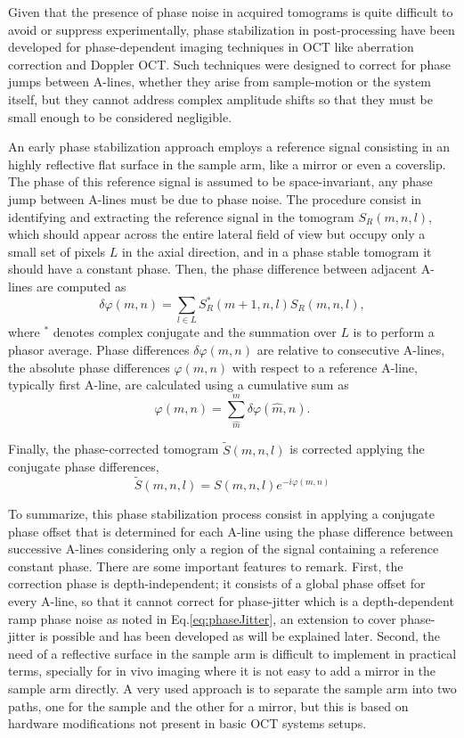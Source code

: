 Given that the presence of phase noise in acquired tomograms is quite difficult to avoid or suppress experimentally, phase stabilization in post-processing have been developed for phase-dependent imaging techniques in OCT like aberration correction and Doppler OCT. Such techniques were designed to correct for phase jumps between A-lines, whether they arise from sample-motion or the system itself, but they cannot address complex amplitude shifts so that they must be small enough to be considered negligible.

An early phase stabilization approach employs a reference signal consisting in an highly reflective flat surface in the sample arm, like a mirror or even a coverslip. The phase of this reference signal is assumed to be space-invariant, any phase jump between A-lines must be due to phase noise. The procedure consist in identifying and extracting the reference signal in the tomogram $S_R(m,n,l)$, which should appear across the entire lateral field of view but occupy only a small set of pixels $L$ in the axial direction, and in a phase stable tomogram it should have a constant phase. Then, the phase difference between adjacent A-lines are computed as 
\begin{equation}
	\delta\varphi(m,n) = \sum_{l\in L} S_R^*(m+1,n,l)S_R(m,n,l),
\end{equation}
where $^*$ denotes complex conjugate and the summation over $L$ is to perform a phasor average. Phase differences $\delta\varphi(m,n)$ are relative to consecutive A-lines, the absolute phase differences $\varphi(m,n)$ with respect to a reference A-line, typically first A-line, are calculated using a cumulative sum as
\begin{equation}
	\varphi(m,n) = \sum_{\hat{m}}^m \delta\varphi(\hat{m},n).
\end{equation}

Finally, the phase-corrected tomogram $\tilde{S}(m,n,l)$ is corrected applying the conjugate phase differences,
\begin{equation}
	\tilde{S}(m,n,l) = S(m,n,l)e^{-i\varphi(m,n)}
\end{equation}

To summarize, this phase stabilization process consist in applying a conjugate phase offset that is determined for each A-line using the phase difference between successive A-lines considering only a region of the signal containing a reference constant phase. There are some important features to remark. First, the correction phase is depth-independent; it consists of a global phase offset for every A-line, so that it cannot correct for phase-jitter which is a depth-dependent ramp phase noise as noted in Eq.\eqref{eq:phaseJitter}, an extension to cover phase-jitter is possible and has been developed as will be explained later. Second, the need of a reflective surface in the sample arm is difficult to implement in practical terms, specially for in vivo imaging where it is not easy to add a mirror in the sample arm directly. A very used approach is to separate the sample arm into two paths, one for the sample and the other for a mirror, but this is based on hardware modifications not present in basic OCT systems setups. 



